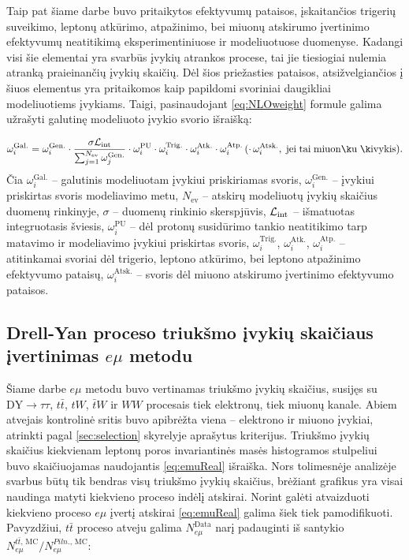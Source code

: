 \documentclass[a4paper, 12pt]{article}
\newcommand{\tbarW}{\bar{t}W}
\newcommand{\ttbar}{t\bar{t}}
\newcommand{\emu}{e\mu}
\newcommand{\DYtau}{\mathrm{DY} \! \rightarrow \! \tau\tau}
\newcommand{\Lumi}{{\cal L}_\mathrm{int}}
\newlength\q
\begin{document}
Taip pat šiame darbe buvo pritaikytos efektyvumų pataisos, įskaitančios trigerių suveikimo, leptonų atkūrimo, atpažinimo, bei miuonų
atskirumo įvertinimo efektyvumų neatitikimą eksperimentiniuose ir modeliuotuose duomenyse.
Kadangi visi šie elementai yra svarbūs įvykių atrankos procese, tai jie tiesiogiai nulemia atranką praieinančių įvykių skaičių.
Dėl šios priežasties pataisos, atsižvelgiančios į šiuos elementus yra pritaikomos kaip papildomi svoriniai daugikliai modeliuotiems
įvykiams.
Taigi, pasinaudojant \eqref{eq:NLOweight} formule galima užrašyti galutinę modeliuoto įvykio svorio išraišką:

\begin{equation}
	\omega_{i}^{\mathrm{Gal.}} = \omega_{i}^{\mathrm{Gen.}} \cdot
	\frac{ \sigma\Lumi }{ \sum_{j=1}^{N_{\mathrm{ev}}}\omega_{j}^{\mathrm{Gen.}} } \cdot
	\omega_{i}^{\mathrm{PU}} \cdot \omega_{i}^{\mathrm{Trig.}} \cdot \omega_{i}^{\mathrm{Atk.}} \cdot \omega_{i}^{\mathrm{Atp.}} \,
	( \cdot \, \omega_{i}^{\mathrm{Atsk.}} , \; \mathrm{jei \; tai \; miuonų \; įvykis} ).
	\label{eq:weightwSF}
\end{equation}
Čia $\omega_{i}^{\mathrm{Gal.}}$ -- galutinis modeliuotam įvykiui priskiriamas svoris, $\omega_{i}^{\mathrm{Gen.}}$ -- įvykiui
priskirtas svoris modeliavimo metu, $N_{\mathrm{ev}}$ -- atskirų modeliuotų įvykių skaičius duomenų rinkinyje, $\sigma$ --
duomenų rinkinio skerspjūvis, $\Lumi$ -- išmatuotas integruotasis šviesis, $\omega_{i}^{\mathrm{PU}}$ -- dėl protonų susidūrimo
tankio neatitikimo tarp matavimo ir modeliavimo įvykiui priskirtas svoris, $\omega_{i}^{\mathrm{Trig.}}$,
$\omega_{i}^{\mathrm{Atk.}}$,  $\omega_{i}^{\mathrm{Atp.}}$ -- atitinkamai svoriai dėl trigerio, leptono atkūrimo, bei leptono
atpažinimo efektyvumo pataisų, $\omega_{i}^{\mathrm{Atsk.}}$ -- svoris dėl miuono atskirumo įvertinimo efektyvumo pataisos.

\subsection{Drell-Yan proceso triukšmo įvykių skaičiaus įvertinimas $\emu$ metodu} \label{sec:emu}

Šiame darbe $\emu$ metodu buvo vertinamas triukšmo įvykių skaičius, susijęs su $\DYtau$, $\ttbar$, $tW$, $\tbarW$ ir $WW$
procesais tiek elektronų, tiek miuonų kanale.
Abiem atvejais kontrolinė sritis buvo apibrėžta viena -- elektrono ir miuono įvykiai, atrinkti pagal \ref{sec:selection}
skyrelyje aprašytus kriterijus.
Triukšmo įvykių skaičius kiekvienam leptonų poros invariantinės masės histogramos stulpeliui buvo skaičiuojamas naudojantis
\eqref{eq:emuReal} išraiška.
Nors tolimesnėje analizėje svarbus būtų tik bendras visų triukšmo įvykių skaičius, brėžiant grafikus yra visai naudinga
matyti kiekvieno proceso indėlį atskirai.
Norint galėti atvaizduoti kiekvieno proceso $\emu$ įvertį atskirai \eqref{eq:emuReal} galima šiek tiek pamodifikuoti.
Pavyzdžiui, $\ttbar$ proceso atveju galima $N_{\emu}^{\mathrm{Data}}$ narį padauginti iš santykio
$N_{\emu}^{\ttbar, \, \mathrm{MC}} / N_{\emu}^{Piln., \, \mathrm{MC}}$:
\end{document}

